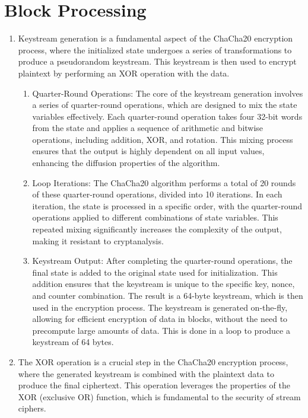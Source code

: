 \documentclass[a4paper,12pt]{report}
\begin{document}
\section{Block Processing}
\begin{enumerate}
    \item Keystream generation is a fundamental aspect of the ChaCha20 encryption process, where the initialized state undergoes a series of transformations to produce a pseudorandom keystream.
    This keystream is then used to encrypt plaintext by performing an XOR operation with the data.

\begin{enumerate}
    \item Quarter-Round Operations: The core of the keystream generation involves a series of quarter-round operations, which are designed to mix the state variables effectively.
    Each quarter-round operation takes four 32-bit words from the state and applies a sequence of arithmetic and bitwise operations, including addition, XOR, and rotation.
    This mixing process ensures that the output is highly dependent on all input values, enhancing the diffusion properties of the algorithm.
    \item Loop Iterations: The ChaCha20 algorithm performs a total of 20 rounds of these quarter-round operations, divided into 10 iterations.
    In each iteration, the state is processed in a specific order, with the quarter-round operations applied to different combinations of state variables.
    This repeated mixing significantly increases the complexity of the output, making it resistant to cryptanalysis.
    \item Keystream Output: After completing the quarter-round operations, the final state is added to the original state used for initialization.
    This addition ensures that the keystream is unique to the specific key, nonce, and counter combination.
    The result is a 64-byte keystream, which is then used in the encryption process.
    The keystream is generated on-the-fly, allowing for efficient encryption of data in blocks, without the need to precompute large amounts of data.
    This is done in a loop to produce a keystream of 64 bytes.
    \end{enumerate}

    \item The XOR operation is a crucial step in the ChaCha20 encryption process, where the generated keystream is combined with the plaintext data to produce the final ciphertext. This operation leverages the properties of the XOR (exclusive OR) function, which is fundamental to the security of stream ciphers.


\end{enumerate}
\end{document}

